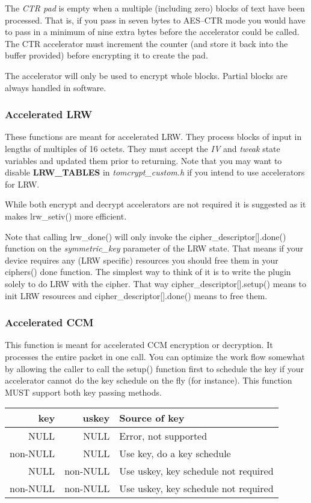 \documentclass[synpaper]{book}
\begin{document}
The \textit{CTR pad} is empty when a multiple (including zero) blocks of text have been processed.  That is, if you pass in seven bytes to AES--CTR mode you would have to
pass in a minimum of nine extra bytes before the accelerator could be called.  The CTR accelerator must increment the counter (and store it back into the
buffer provided) before encrypting it to create the pad.

The accelerator will only be used to encrypt whole blocks.  Partial blocks are always handled in software.

\subsubsection{Accelerated LRW}
These functions are meant for accelerated LRW.  They process blocks of input in lengths of multiples of 16 octets.  They must accept the \textit{IV} and \textit{tweak}
state variables and updated them prior to returning.  Note that you may want to disable \textbf{LRW\_TABLES} in \textit{tomcrypt\_custom.h} if you intend
to use accelerators for LRW.

While both encrypt and decrypt accelerators are not required it is suggested as it makes lrw\_setiv() more efficient.

Note that calling lrw\_done() will only invoke the cipher\_descriptor[].done() function on the \textit{symmetric\_key} parameter of the LRW state.  That means
if your device requires any (LRW specific) resources you should free them in your ciphers() done function.  The simplest way to think of it is to write
the plugin solely to do LRW with the cipher.  That way cipher\_descriptor[].setup() means to init LRW resources and cipher\_descriptor[].done() means to
free them.

\subsubsection{Accelerated CCM}
This function is meant for accelerated CCM encryption or decryption.  It processes the entire packet in one call.  You can optimize the work flow somewhat
by allowing the caller to call the setup() function first to schedule the key if your accelerator cannot do the key schedule on the fly (for instance).  This
function MUST support both key passing methods.

\begin{center}
\begin{small}
\begin{tabular}{|r|r|l|}
\hline \textbf{key} & \textbf{uskey} & \textbf{Source of key} \\
\hline NULL         & NULL           & Error, not supported \\
\hline non-NULL     & NULL           & Use key, do a key schedule \\
\hline NULL         & non-NULL       & Use uskey, key schedule not required \\
\hline non-NULL     & non-NULL       & Use uskey, key schedule not required \\
\hline
\end{tabular}
\end{small}
\end{center}
\end{document}
